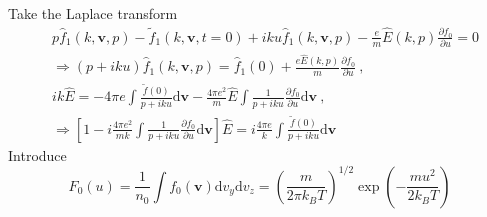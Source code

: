 \documentclass[12pt,a4paper]{article}
\renewcommand{\vec}[1]{\boldsymbol{#1}}
\newcommand{\dif}{\mathrm{d}}
\begin{document}
Take the Laplace transform 
\begin{align*}
& p \hat{f}_1(k, \vec{v}, p) -\tilde{f}_1(k, \vec{v}, t = 0) +ik u \hat{f}_1(k, \vec{v}, p) -\frac{e}{m} \hat{E}(k, p) \frac{\partial f_0}{\partial u} = 0 \\
& \Rightarrow (p +iku) \hat{f}_1(k, \vec{v}, p) = \hat{f}_1(0) +\frac{e \hat{E}(k, p) }{m} \frac{\partial f_0}{\partial u} ~, \\
& i k \hat{E} = -4\pi e \int \frac{\tilde{f}(0)}{p+iku}  \dif \vec{v} -\frac{4\pi e^2 }{m} \hat{E} \int \frac{1}{p+iku} \frac{\partial f_0}{\partial u}  \dif \vec{v} ~, \\
& \Rightarrow \left[1 -i \frac{4\pi e^2}{mk} \int \frac{1}{p+iku} \frac{\partial f_0}{\partial u}  \dif \vec{v} \right] \hat{E} = i\frac{4\pi e}{k} \int \frac{\tilde{f}(0)}{p+iku} \dif \vec{v} 
\end{align*}
Introduce
\begin{equation}
F_0(u) = \frac{1}{n_0} \int f_0(\vec{v}) \dif v_y \dif v_z = \left(\frac{m}{2\pi k_B T} \right)^{1/2} \exp \left(-\frac{m u^2}{2k_B T} \right)
\end{equation}
\end{document}
